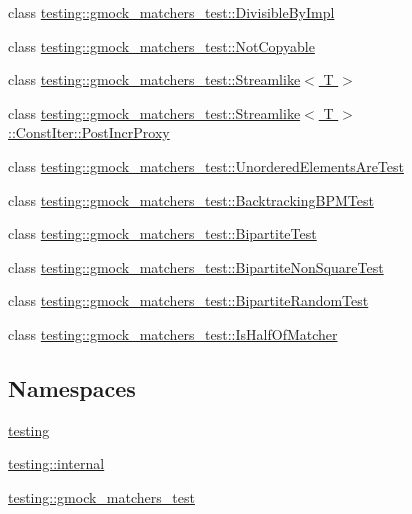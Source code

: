 \begin{DoxyCompactItemize}
\item 
class \hyperlink{classtesting_1_1gmock__matchers__test_1_1_divisible_by_impl}{testing\+::gmock\+\_\+matchers\+\_\+test\+::\+Divisible\+By\+Impl}
\item 
class \hyperlink{classtesting_1_1gmock__matchers__test_1_1_not_copyable}{testing\+::gmock\+\_\+matchers\+\_\+test\+::\+Not\+Copyable}
\item 
class \hyperlink{classtesting_1_1gmock__matchers__test_1_1_streamlike}{testing\+::gmock\+\_\+matchers\+\_\+test\+::\+Streamlike$<$ T $>$}
\item 
class \hyperlink{classtesting_1_1gmock__matchers__test_1_1_streamlike_1_1_const_iter_1_1_post_incr_proxy}{testing\+::gmock\+\_\+matchers\+\_\+test\+::\+Streamlike$<$ T $>$\+::\+Const\+Iter\+::\+Post\+Incr\+Proxy}
\item 
class \hyperlink{classtesting_1_1gmock__matchers__test_1_1_unordered_elements_are_test}{testing\+::gmock\+\_\+matchers\+\_\+test\+::\+Unordered\+Elements\+Are\+Test}
\item 
class \hyperlink{classtesting_1_1gmock__matchers__test_1_1_backtracking_b_p_m_test}{testing\+::gmock\+\_\+matchers\+\_\+test\+::\+Backtracking\+B\+P\+M\+Test}
\item 
class \hyperlink{classtesting_1_1gmock__matchers__test_1_1_bipartite_test}{testing\+::gmock\+\_\+matchers\+\_\+test\+::\+Bipartite\+Test}
\item 
class \hyperlink{classtesting_1_1gmock__matchers__test_1_1_bipartite_non_square_test}{testing\+::gmock\+\_\+matchers\+\_\+test\+::\+Bipartite\+Non\+Square\+Test}
\item 
class \hyperlink{classtesting_1_1gmock__matchers__test_1_1_bipartite_random_test}{testing\+::gmock\+\_\+matchers\+\_\+test\+::\+Bipartite\+Random\+Test}
\item 
class \hyperlink{classtesting_1_1gmock__matchers__test_1_1_is_half_of_matcher}{testing\+::gmock\+\_\+matchers\+\_\+test\+::\+Is\+Half\+Of\+Matcher}
\end{DoxyCompactItemize}
\subsection*{Namespaces}
\begin{DoxyCompactItemize}
\item 
 \hyperlink{namespacetesting}{testing}
\item 
 \hyperlink{namespacetesting_1_1internal}{testing\+::internal}
\item 
 \hyperlink{namespacetesting_1_1gmock__matchers__test}{testing\+::gmock\+\_\+matchers\+\_\+test}
\end{DoxyCompactItemize}
